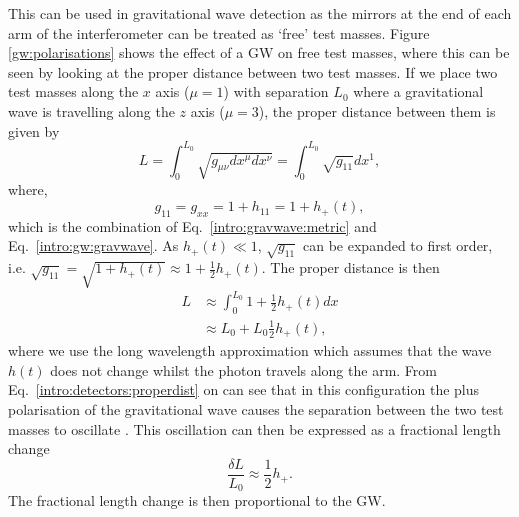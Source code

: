 This can be used in gravitational wave detection as the mirrors at the end of
each arm of the interferometer can be treated as `free' test masses.  Figure
\ref{gw:polarisations} shows the effect of a \gls{GW} on free test masses, where this can be seen by looking at the proper distance between two test masses.  If we
place two test masses along the $x$ axis ($\mu = 1$) with separation $L_0$ where a
gravitational wave is travelling along the $z$ axis ($\mu = 3$), the proper distance
between them is given by
%
\begin{equation}
    L = \int_{0}^{L_0} \sqrt{g_{\mu \nu} dx^{\mu} dx^{\nu}}= \int_{0}^{L_0} \sqrt{g_{11}} dx^1,
\end{equation}
%
where,
\begin{equation}
    \label{intro:detectors:metricpertubation}
     g_{11} = g_{xx} = 1 + h_{11} = 1 + h_{+}(t),
\end{equation}
which is the combination of Eq.~\ref{intro:gravwave:metric} and Eq.~\ref{intro:gw:gravwave}.  As $h_{+}(t) \ll 1$, $\sqrt{g_{11}}$ can be expanded to first order, i.e.  $\sqrt{g_{11}} = \sqrt{1 +
h_{+}(t)} \approx 1 + \frac{1}{2}h_{+}(t)$.  The proper distance is then
%
\begin{equation}
    \label{intro:detectors:properdist}
    \begin{split}
     L &\approx \int_{0}^{L_0} 1 + \frac{1}{2}h_{+}(t) dx \\
      &\approx L_0 + L_0 \frac{1}{2}h_{+}(t),
    \end{split}
\end{equation}
%
where we use the long wavelength approximation which assumes that the wave $h(t)$ does not change whilst the photon travels along the arm.
From Eq.~\ref{intro:detectors:properdist} on can see that in this configuration the
plus polarisation of the gravitational wave causes the separation between the
two test masses to oscillate \citep{flanagan2005BasicsGravitational}.  This
oscillation can then be expressed as a fractional length change
%
\begin{equation}
    \label{intro:detectors:fraclength}
    \frac{\delta L}{L_0} \approx \frac{1}{2} h_{+}.
\end{equation}
%
The fractional length change is then proportional to the \gls{GW}.

